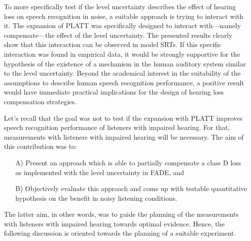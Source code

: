 \documentclass[10pt,a4paper,twocolumn]{article}
\begin{document}
To more specifically test if the level uncertainty describes the effect of hearing loss on speech recognition in noise, a suitable approach is trying to interact with it.
%
The expansion of PLATT was specifically designed to interact with---namely compensate---the effect of the level uncertainty.
%
The presented results clearly show that this interaction can be observed in model SRTs.
%
If this specific interaction was found in empirical data, it would be strongly supportive for the hypothesis of the existence of a mechanism in the human auditory system similar to the level uncertainty.
%
Beyond the academical interest in the suitability of the assumptions to describe human speech recognition performance, a positive result would have immediate practical implications for the design of hearing loss compensation strategies.

Let's recall that the goal was not to test if the expansion with PLATT improves speech recognition performance of listeners with impaired hearing.
%
For that, measurements with listeners with impaired hearing will be necessary.
%
The aim of this contribution was to:
%
\begin{itemize}
	\item[A)] Present an approach which is able to partially compensate a class D loss as implemented with the level uncertainty in FADE, and
	\item[B)] Objectively evaluate this approach and come up with testable quantitative hypothesis on the benefit in noisy listening conditions.
\end{itemize}
%
The latter aim, in other words, was to guide the planning of the measurements with listeners with impaired hearing towards optimal evidence.
%
Hence, the following discussion is oriented towards the planning of a suitable experiment.
\end{document}
